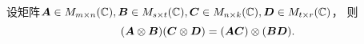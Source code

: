\begin{lemma}
设矩阵\(\boldsymbol{A} \in M_{m \times n}(\mathbb{C}),
\boldsymbol{B} \in M_{s \times t}(\mathbb{C}),
\boldsymbol{C} \in M_{n \times k}(\mathbb{C}),
\boldsymbol{D} \in M_{t \times r}(\mathbb{C})\)，
则\begin{equation}
	(\boldsymbol{A}\otimes\boldsymbol{B})
	(\boldsymbol{C}\otimes\boldsymbol{D})
	= (\boldsymbol{A}\boldsymbol{C})\otimes(\boldsymbol{B}\boldsymbol{D}).
\end{equation}
\end{lemma}
